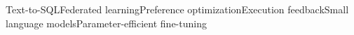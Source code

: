 Text-to-SQL\kwsep Federated learning\kwsep Preference optimization\kwsep Execution feedback\kwsep Small language models\kwsep Parameter-efficient fine-tuning
